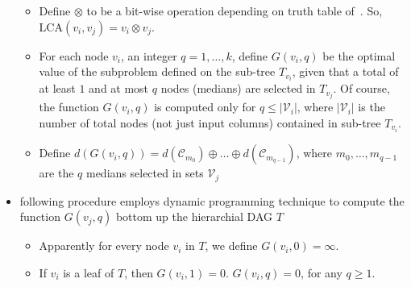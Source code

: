 \begin{itemize}
\begin{itemize}
            \item Define $\otimes$ to be a bit-wise operation depending
            on truth table of~. So, $\mbox{LCA}(v_i,
            v_j) = v_i \otimes v_j$.

            \item For each node $v_i$, an integer $q = 1, \ldots, k$,
            define $G(v_i, q)$ be the optimal value of the subproblem
            defined on the sub-tree $T_{v_i}$, given that a total of at
            least $1$ and at most $q$ nodes (medians) are selected in
            $T_{v_j}$. Of course, the function $G(v_i, q)$ is computed
            only for $q \leq |\mathcal{V}_i|$, where $|\mathcal{V}_i|$
            is the number of total nodes (not just input columns)
            contained in sub-tree $T_{v_i}$.

            \item Define $d(G(v_i, q)) = d(\mathcal{C}_{m_0}) \oplus
            \ldots \oplus d(\mathcal{C}_{m_{q-1}})$, where $m_0,
            \ldots, m_{q-1}$ are the $q$ medians selected in sets
            $\mathcal{V}_j$

        \end{itemize}


    \item following procedure employs dynamic programming technique
    to compute the function $G(v_j, q)$ bottom up the hierarchial
    {DAG} $T$

    \begin{itemize}

        \item Apparently for every node $v_i$ in $T$, we define 
        $G(v_i, 0) = \infty$.

        \item If $v_i$ is a leaf of $T$, then $G(v_i, 1) = 0$. 
        $G(v_i, q) = 0$, for any $q \geq 1$.


\end{itemize}
\end{itemize}

